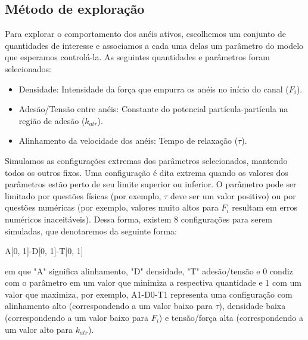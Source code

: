 \documentclass{article}
\theoremstyle{definition}
\begin{document}
\subsection{Método de exploração}
Para explorar o comportamento dos anéis ativos, escolhemos um conjunto de quantidades de interesse e associamos a cada uma delas um parâmetro do modelo que esperamos controlá-la. As seguintes quantidades e parâmetros foram selecionados: 
\begin{itemize}
    \item Densidade: Intensidade da força que empurra os anéis no início do canal ($F_i$).
    \item Adesão/Tensão entre anéis: Constante do potencial partícula-partícula na região de adesão ($k_{atr}$).
    \item Alinhamento da velocidade dos anéis: Tempo de relaxação ($\tau$).
\end{itemize}
Simulamos as configurações extremas dos parâmetros selecionados, mantendo todos os outros fixos. Uma configuração é dita extrema quando os valores dos parâmetros estão perto de seu limite superior ou inferior. O parâmetro pode ser limitado por questões físicas (por exemplo, $\tau$ deve ser um valor positivo) ou por questões numéricas (por exemplo, valores muito altos para $F_i$ resultam em erros numéricos inaceitáveis). Dessa forma, existem 8 configurações para serem simuladas, que denotaremos da seguinte forma:
\begin{center}
A[0, 1]-D[0, 1]-T[0, 1] 
\end{center}
em que "A" significa alinhamento, "D" densidade, "T" adesão/tensão e 0 condiz com o parâmetro em um valor que minimiza a respectiva quantidade e 1 com um valor que maximiza, por exemplo, A1-D0-T1 representa uma configuração com alinhamento alto (correspondendo a um valor baixo para $\tau$), densidade baixa (correspondendo a um valor baixo para $F_i$) e tensão/força alta (correspondendo a um valor alto para $k_{atr}$). 
\end{document}
